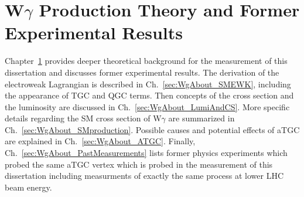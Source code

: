 \section{W$\gamma$ Production Theory and Former Experimental Results} %
\label{sec:WgAbout}

Chapter~\ref{sec:WgAbout} provides deeper theoretical background for the measurement of this dissertation and discusses former experimental results. The derivation of the electroweak Lagrangian is described in Ch.~\ref{sec:WgAbout_SMEWK}, including the appearance of TGC and QGC terms. Then concepts of the cross section and the luminosity are discussed in Ch.~\ref{sec:WgAbout_LumiAndCS}. More specific details regarding the SM cross section of W$\gamma$ are summarized in Ch.~\ref{sec:WgAbout_SMproduction}. Possible causes and potential effects of aTGC are explained in Ch.~\ref{sec:WgAbout_ATGC}. Finally, Ch.~\ref{sec:WgAbout_PastMeasurements} lists former physics experiments which probed the same aTGC vertex which is probed in the measurement of this dissertation including measurments of exactly the same process at lower LHC beam energy.\\

